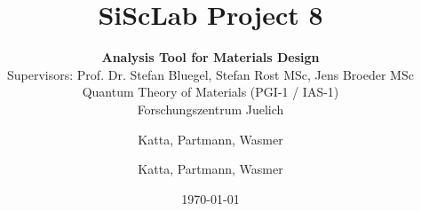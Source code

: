 \documentclass{beamer}
\begin{document}
\title{SiScLab Project 8}
\subtitle{\textbf{Analysis Tool for Materials Design}\\Supervisors: Prof. Dr. Stefan Bluegel, Stefan Rost MSc, Jens Broeder MSc\\
Quantum Theory of Materials (PGI-1 / IAS-1)\\
Forschungszentrum Juelich}
\author{Katta, Partmann, Wasmer}
\author{Katta, Partmann, Wasmer}
\date{\today} 

\begin{frame}
\titlepage
\end{frame}






\end{document}
